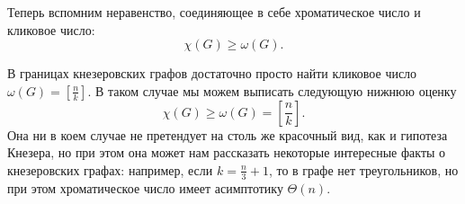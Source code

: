 	Теперь вспомним неравенство, соединяющее в себе хроматическое число и кликовое число:
	$$\chi(G) \geqslant \omega(G).$$
	
	В границах кнезеровских графов достаточно просто найти кликовое число $\omega(G) = \left[ \frac{n}{k}\right]$. В таком случае мы можем выписать следующую нижнюю оценку
	$$\chi(G) \geqslant \omega(G) = \left[ \frac{n}{k} \right].$$
	Она ни в коем случае не претендует на столь же красочный вид, как и гипотеза Кнезера, но при этом она может нам рассказать некоторые интересные факты о кнезеровских графах: например, если $k = \frac{n}{3} + 1$, то в графе нет треугольников, но при этом хроматическое число имеет асимптотику $\Theta(n)$. 




	